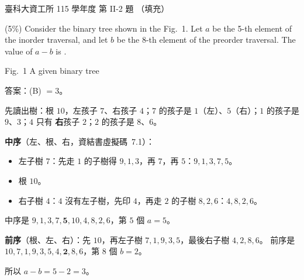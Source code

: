 \begin{pastexam}[label={px:ntust-115-ice-10}]{臺科大資工所 115 學年度 第 II-2 題}
（填充）

(5\%) Consider the binary tree shown in the Fig.~1. Let $a$ be the 5-th element of the inorder traversal, and
let $b$ be the 8-th element of the preorder traversal. The value of $a-b$ is .

\begin{center}

Fig.~1 A given binary tree
\end{center}
\end{pastexam}

\begin{pastsoln}
答案：(B) $= 3$。

先讀出樹：根 $10$，左孩子 $7$、右孩子 $4$；$7$ 的孩子是 $1$（左）、$5$（右）；$1$ 的孩子是 $9$、$3$；$4$ 只有
\textbf{右}孩子 $2$；$2$ 的孩子是 $8$、$6$。

\textbf{中序}（左、根、右，資結書虛擬碼~7.1）：
\begin{itemize}
\item 左子樹 $7$：先走 $1$ 的子樹得 $9, 1, 3$，再 $7$，再 $5$：$9, 1, 3, 7, 5$。
\item 根 $10$。
\item 右子樹 $4$：$4$ 沒有左子樹，先印 $4$，再走 $2$ 的子樹 $8, 2, 6$：$4, 8, 2, 6$。
\end{itemize}
中序是 $9, 1, 3, 7, \mathbf{5}, 10, 4, 8, 2, 6$，第 $5$ 個 $a = 5$。

\textbf{前序}（根、左、右）：先 $10$，再左子樹 $7, 1, 9, 3, 5$，最後右子樹 $4, 2, 8, 6$。 前序是
$10, 7, 1, 9, 3, 5, 4, \mathbf{2}, 8, 6$，第 $8$ 個 $b = 2$。

所以 $a - b = 5 - 2 = 3$。
\end{pastsoln}
